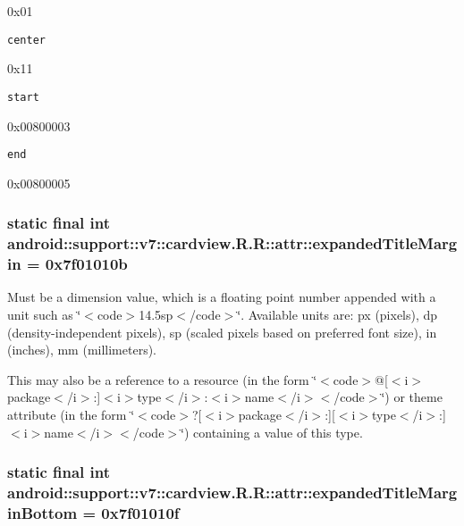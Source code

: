 0x01

{\tt center}

0x11

{\tt start}

0x00800003

{\tt end}

0x00800005\hypertarget{classandroid_1_1support_1_1v7_1_1cardview_1_1_r_1_1attr_722af4b71e66aca2501b895c3ff7519e}{
\subsubsection[{expandedTitleMargin}]{\setlength{\rightskip}{0pt plus 5cm}static final int android::support::v7::cardview.R.R::attr::expandedTitleMargin = 0x7f01010b}}
\label{classandroid_1_1support_1_1v7_1_1cardview_1_1_r_1_1attr_722af4b71e66aca2501b895c3ff7519e}


Must be a dimension value, which is a floating point number appended with a unit such as \char`\"{}$<$code$>$14.5sp$<$/code$>$\char`\"{}. Available units are: px (pixels), dp (density-independent pixels), sp (scaled pixels based on preferred font size), in (inches), mm (millimeters). 

This may also be a reference to a resource (in the form \char`\"{}$<$code$>$@\mbox{[}$<$i$>$package$<$/i$>$:\mbox{]}$<$i$>$type$<$/i$>$:$<$i$>$name$<$/i$>$$<$/code$>$\char`\"{}) or theme attribute (in the form \char`\"{}$<$code$>$?\mbox{[}$<$i$>$package$<$/i$>$:\mbox{]}\mbox{[}$<$i$>$type$<$/i$>$:\mbox{]}$<$i$>$name$<$/i$>$$<$/code$>$\char`\"{}) containing a value of this type. \hypertarget{classandroid_1_1support_1_1v7_1_1cardview_1_1_r_1_1attr_a533fb39de01ee901bedc0527287cfbd}{
\subsubsection[{expandedTitleMarginBottom}]{\setlength{\rightskip}{0pt plus 5cm}static final int android::support::v7::cardview.R.R::attr::expandedTitleMarginBottom = 0x7f01010f}}
\label{classandroid_1_1support_1_1v7_1_1cardview_1_1_r_1_1attr_a533fb39de01ee901bedc0527287cfbd}


